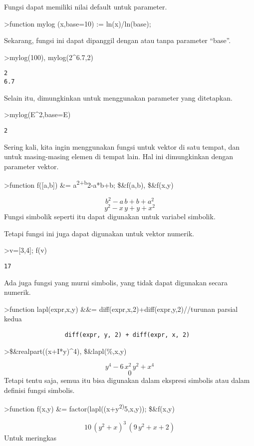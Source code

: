\documentclass[
]{book}
\begin{document}
Fungsi dapat memiliki nilai default untuk parameter.

\textgreater function mylog (x,base=10) := ln(x)/ln(base);

Sekarang, fungsi ini dapat dipanggil dengan atau tanpa parameter ``base''.

\textgreater mylog(100), mylog(2\^{}6.7,2)

\begin{verbatim}
2
6.7
\end{verbatim}

Selain itu, dimungkinkan untuk menggunakan parameter yang ditetapkan.

\textgreater mylog(E\^{}2,base=E)

\begin{verbatim}
2
\end{verbatim}

Sering kali, kita ingin menggunakan fungsi untuk vektor di satu tempat, dan untuk masing-masing elemen di tempat lain. Hal ini dimungkinkan dengan parameter vektor.

\textgreater function f({[}a,b{]}) \&= a\textsuperscript{2+b}2-a*b+b; \$\&f(a,b), \$\&f(x,y)

\[b^2-a\,b+b+a^2\]\[y^2-x\,y+y+x^2\]Fungsi simbolik seperti itu dapat digunakan untuk variabel simbolik.

Tetapi fungsi ini juga dapat digunakan untuk vektor numerik.

\textgreater v={[}3,4{]}; f(v)

\begin{verbatim}
17
\end{verbatim}

Ada juga fungsi yang murni simbolis, yang tidak dapat digunakan secara numerik.

\textgreater function lapl(expr,x,y) \&\&= diff(expr,x,2)+diff(expr,y,2)//turunan parsial kedua

\begin{verbatim}
                 diff(expr, y, 2) + diff(expr, x, 2)
\end{verbatim}

\textgreater\$\&realpart((x+I*y)\^{}4), \$\&lapl(\%,x,y)

\[y^4-6\,x^2\,y^2+x^4\]\[0\]Tetapi tentu saja, semua itu bisa digunakan dalam ekspresi simbolis atau dalam definisi fungsi simbolis.

\textgreater function f(x,y) \&= factor(lapl((x+y\textsuperscript{2)}5,x,y)); \$\&f(x,y)

\[10\,\left(y^2+x\right)^3\,\left(9\,y^2+x+2\right)\]Untuk meringkas
\end{document}
